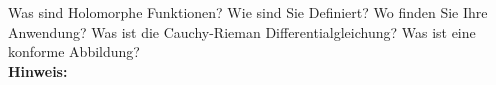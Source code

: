 \begin{question}[section=3,subsection=32,name={Holomorphe Funktionen},difficulty=9,type=mdl,mode=exm,tags={}]
	Was sind Holomorphe Funktionen? Wie sind Sie Definiert? Wo finden Sie Ihre Anwendung? Was ist die Cauchy-Rieman Differentialgleichung? Was ist eine konforme Abbildung?
	\\ \textbf{Hinweis:}\\
	
\end{question}
\begin{solution}
	
\end{solution}